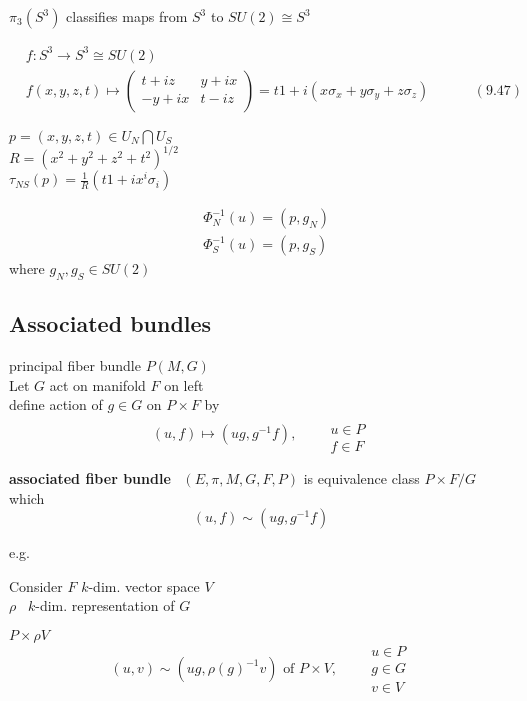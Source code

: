\documentclass{book}
\begin{document}
$\pi_3(S^3)$ classifies maps from $S^3$ to $SU(2) \cong S^3$


\begin{equation}
  \begin{aligned}
    & f:S^3 \to S^3 \cong SU(2) \\ 
    & f(x,y,z,t) \mapsto \left( \begin{matrix} t + iz & y + ix \\ 
      -y +ix & t-iz \end{matrix} \right) = t1 + i (x \sigma_x + y \sigma_y + z \sigma_z ) \quad \quad \quad \, (9.47)
\end{aligned}
\end{equation}

$p = (x,y,z,t) \in U_N \bigcap U_S$ \\
$R = (x^2 + y^2 + z^2 + t^2)^{1/2}$ \\

$\tau_{NS}{(p)} = \frac{1}{R}(t1 + ix^i \sigma_i)$

\[
\begin{aligned}
  & \Phi_N^{-1}(u) = (p,g_N) \\ 
  & \Phi_S^{-1}(u) = (p,g_S)
\end{aligned}
\]
where $g_N, g_S \in SU(2)$



\subsection{ Associated bundles }

principal fiber bundle $P(M,G)$ \\
Let $G$ act on manifold $F$ on left  \\

define action of $g \in G$ on $P\times F$ by 
\[
(u,f) \mapsto (ug, g^{-1}f), \quad \, \begin{aligned} & \quad \\
  & u \in P \\
& f \in F \end{aligned}
\]

\textbf{associated fiber bundle } \, $(E, \pi, M, G, F, P)$ is equivalence class $P \times F/ G$ which 
\[
(u, f) \sim ( ug, g^{-1}f)
\]

e.g.  

Consider $F$ $k$-dim. vector space $V$ \\
\quad $\rho$ \, $k$-dim. representation of $G$

$P\times \rho V$ 
\[
(u,v) \sim (ug, \rho(g)^{-1} v) \text{ of } P \times V, \quad \, \begin{aligned} 
  & u \in P \\
& g \in G \\
  & v \in V \end{aligned}
\]
\end{document}
